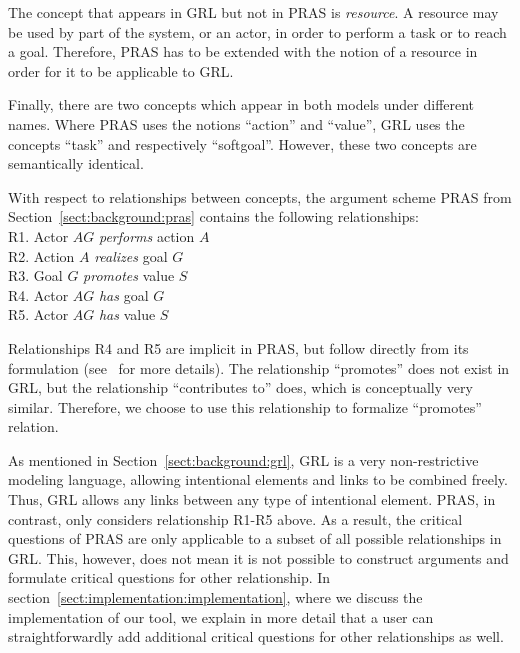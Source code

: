 \documentclass[11.5pt,two column]{llncs}
\begin{document}
The concept that appears in GRL but not in PRAS is \emph{resource}. A resource may be used by part of the system, or an actor, in order to perform a task or to reach a goal. Therefore, PRAS has to be extended with the notion of a resource in order for it to be applicable to GRL. %

Finally, there are two concepts which appear in both models under different names. Where PRAS uses the notions ``action'' and ``value'', GRL uses the concepts ``task'' and respectively ``softgoal''. However, these two concepts are semantically identical.

With respect to relationships between concepts, the argument scheme PRAS from Section~\ref{sect:background:pras} contains the following relationships:\\

\noindent
R1. Actor $AG$ \emph{performs} action $A$\\
R2. Action $A$ \emph{realizes} goal $G$\\
R3. Goal $G$ \emph{promotes} value $S$\\
R4. Actor $AG$ \emph{has} goal $G$\\
R5. Actor $AG$ \emph{has} value $S$\\

\noindent

Relationships R4 and R5 are implicit in PRAS, but follow directly from its formulation (see~\cite{atkinson2007} for more details). The relationship ``promotes'' does not exist in GRL, but the relationship ``contributes to'' does, which is conceptually very similar. Therefore, we choose to use this relationship to formalize ``promotes'' relation.

As mentioned in Section~\ref{sect:background:grl}, GRL is a very non-restrictive modeling language, allowing intentional elements and links to be combined freely. Thus, GRL allows any links between any type of intentional element. PRAS, in contrast, only considers relationship R1-R5 above. As a result, the critical questions of PRAS are only applicable to a subset of all possible relationships in GRL. This, however, does not mean it is not possible to construct arguments and formulate critical questions for other relationship. In section~\ref{sect:implementation:implementation}, where we discuss the implementation of our tool, we explain in more detail that a user can straightforwardly add additional critical questions for other relationships as well.
\end{document}

